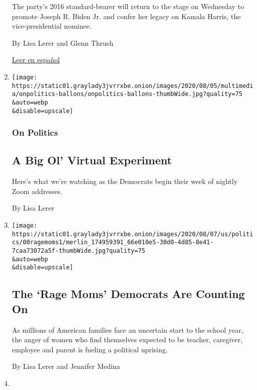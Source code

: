 \begin{enumerate}
  The party's 2016 standard-bearer will return to the stage on Wednesday
  to promote Joseph R. Biden Jr. and confer her legacy on Kamala Harris,
  the vice-presidential nominee.

  By Lisa Lerer and Glenn Thrush

  \href{https://www.nytimes3xbfgragh.onion/es/2020/08/19/espanol/estados-unidos/hillary-clinton-convencion.html}{Leer
  en español}
\item
  \href{/2020/08/17/us/politics/2020-democratic-national-convention-biden.html}{}

  \texttt{[image: https://static01.graylady3jvrrxbe.onion/images/2020/08/05/multimedia/onpolitics-ballons/onpolitics-ballons-thumbWide.jpg?quality=75\\\&auto=webp\\\&disable=upscale]}

  \hypertarget{on-politics}{%
  \subsubsection{On Politics}\label{on-politics}}

  \hypertarget{a-big-ol-virtual-experiment}{%
  \subsection{A Big Ol' Virtual
  Experiment}\label{a-big-ol-virtual-experiment}}

  Here's what we're watching as the Democrats begin their week of
  nightly Zoom addresses.

  By Lisa Lerer
\item
  \href{/2020/08/17/us/politics/democrats-women-voters-anger.html}{}

  \texttt{[image: https://static01.graylady3jvrrxbe.onion/images/2020/08/07/us/politics/00ragemoms1/merlin\_174959391\_66e010e5-30d0-4d85-8e41-7caa73072a5f-thumbWide.jpg?quality=75\\\&auto=webp\\\&disable=upscale]}

  \hypertarget{the-rage-moms-democrats-are-counting-on}{%
  \subsection{The `Rage Moms' Democrats Are Counting
  On}\label{the-rage-moms-democrats-are-counting-on}}

  As millions of American families face an uncertain start to the school
  year, the anger of women who find themselves expected to be teacher,
  caregiver, employee and parent is fueling a political uprising.

  By Lisa Lerer and Jennifer Medina
\item
  \href{/2020/08/13/us/politics/dnc-virtual-convention-tom-perez.html}{}


\end{enumerate}
